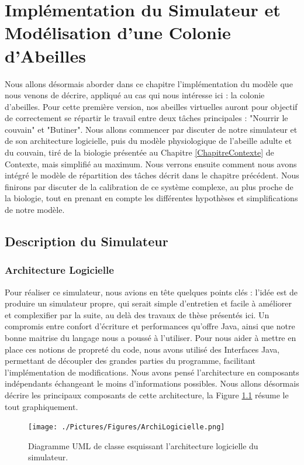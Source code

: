 \chapter{Implémentation du Simulateur et Modélisation d'une Colonie d'Abeilles}
\label{ChapitrePropSMA}

	Nous allons désormais aborder dans ce chapitre l'implémentation du modèle que nous venons de décrire, appliqué au cas qui nous intéresse ici : la colonie d'abeilles. Pour cette première version, nos abeilles virtuelles auront pour objectif de correctement se répartir le travail entre deux tâches principales : "Nourrir le couvain" et "Butiner". Nous allons commencer par discuter de notre simulateur et de son architecture logicielle, puis du modèle physiologique de l'abeille adulte et du couvain, tiré de la biologie présentée au Chapitre \ref{ChapitreContexte} de Contexte, mais simplifié au maximum. Nous verrons ensuite comment nous avons intégré le modèle de répartition des tâches décrit dans le chapitre précédent. Nous finirons par discuter de la calibration de ce système complexe, au plus proche de la biologie, tout en prenant en compte les différentes hypothèses et simplifications de notre modèle.
	
	\section{Description du Simulateur}
		\subsection{Architecture Logicielle}
			Pour réaliser ce simulateur, nous avions en tête quelques points clés : l'idée est de produire un simulateur propre, qui serait simple d'entretien et facile à améliorer et complexifier par la suite, au delà des travaux de thèse présentés ici. Un compromis entre confort d'écriture et performances qu'offre Java, ainsi que notre bonne maitrise du langage nous a poussé à l'utiliser. Pour nous aider à mettre en place ces notions de propreté du code, nous avons utilisé des Interfaces Java, permettant de découpler des grandes parties du programme, facilitant l'implémentation de modifications. Nous avons pensé l'architecture en composants indépendants échangeant le moins d'informations possibles. Nous allons désormais décrire les principaux composants de cette architecture, la Figure \ref{ArchiLogicielle} résume le tout graphiquement.
			
			\begin{figure}
			\centering
			\texttt{[image: ./Pictures/Figures/ArchiLogicielle.png]}
			\caption{Diagramme UML de classe esquissant l'architecture logicielle du simulateur.}
			\label{ArchiLogicielle}
			\end{figure}
			
